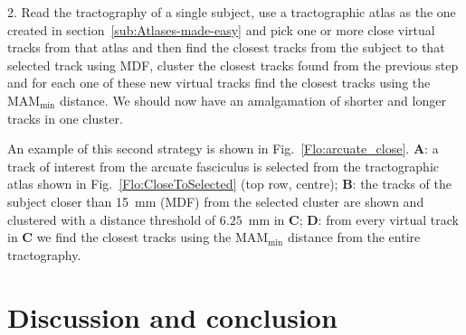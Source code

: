 \documentclass{bioinfo}
\begin{document}
2. Read the tractography of a single subject, use a
tractographic atlas as the one created in
section~\ref{sub:Atlases-made-easy} and pick one or more close virtual
tracks from that atlas and then find the closest tracks from the subject
to that selected track using MDF, cluster the closest tracks found
from the previous step and for each one of these new virtual tracks find
the closest tracks using the $\textrm{MAM}_{\textrm{min}}$ distance. We should now have an
amalgamation of shorter and longer tracks in one cluster.

An example of this second strategy is shown in
Fig.~\ref{Flo:arcuate_close}. \textbf{A}: a track of interest from the arcuate
fasciculus is selected from the tractographic atlas shown in
Fig.~\ref{Flo:CloseToSelected} (top row, centre); \textbf{B}: the tracks of the
subject closer than 15~mm (MDF) from the selected cluster are shown
and clustered with a distance threshold of $6.25$~mm in \textbf{C}; \textbf{D}: from
every virtual track in \textbf{C} we find the closest tracks using the
$\textrm{MAM}_{\textrm{min}}$ distance from the entire tractography.

\section{Discussion and conclusion}


\end{document}
